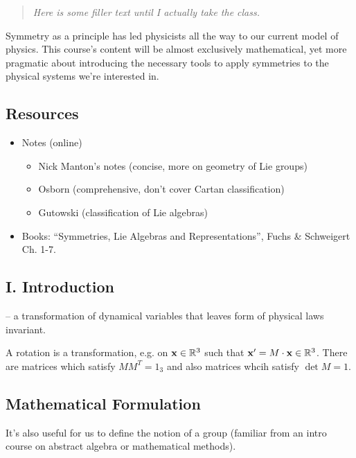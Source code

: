 \begin{quote}\textit{Here is some filler text until I actually take the class.}\end{quote}

Symmetry as a principle has led physicists all the way to our current model of physics. This course's content will be almost exclusively mathematical, yet more pragmatic about introducing the necessary tools to apply symmetries to the physical systems we're interested in.

\subsection*{Resources}
\begin{itemize}
    \item Notes (online)
    \begin{itemize}
        \item Nick Manton's notes (concise, more on geometry of Lie groups)
        \item Osborn (comprehensive, don't cover Cartan classification)
        \item Gutowski (classification of Lie algebras)
    \end{itemize}
    \item Books: ``Symmetries, Lie Algebras and Representations'', Fuchs \& Schweigert Ch. 1-7.
\end{itemize}

\subsection*{I. Introduction}
\begin{defn}
 -- a transformation of dynamical variables that leaves form of physical laws invariant.
\end{defn}
\begin{exm}
A rotation is a transformation, e.g. on $\boldsymbol{\mathbf{x}}\in \mathbb{R}^3$ such that $\boldsymbol{\mathbf{x}}'=M\cdot \boldsymbol{\mathbf{x}} \in \mathbb{R}^3$. There are  matrices which satisfy $MM^T = 1_3$ and also  matrices whcih satisfy $\det M = 1$.
\end{exm}

\subsection*{Mathematical Formulation}
It's also useful for us to define the notion of a group (familiar from an intro course on abstract algebra or mathematical methods).

